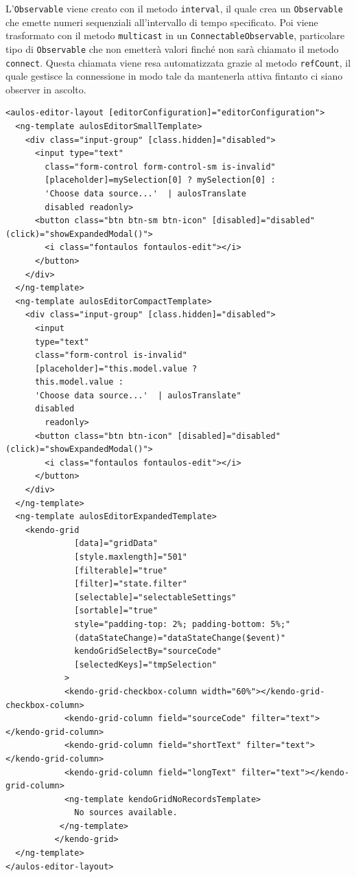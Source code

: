 L'\verb|Observable| viene creato con il metodo \verb|interval|, il quale crea un \verb|Observable| che emette numeri sequenziali all'intervallo di tempo specificato. Poi viene trasformato con il metodo \verb|multicast| in un \verb|ConnectableObservable|, particolare tipo di \verb|Observable| che non emetterà valori finché non sarà chiamato il metodo \verb|connect|. Questa chiamata viene resa automatizzata grazie al metodo \verb|refCount|, il quale gestisce la connessione in modo tale da mantenerla attiva fintanto ci siano observer in ascolto.

\begin{lstlisting}[caption={Classe RefreshService}, style=html]
<aulos-editor-layout [editorConfiguration]="editorConfiguration">
  <ng-template aulosEditorSmallTemplate>
    <div class="input-group" [class.hidden]="disabled">
      <input type="text" 
        class="form-control form-control-sm is-invalid"
        [placeholder]=mySelection[0] ? mySelection[0] : 
        'Choose data source...'  | aulosTranslate 
        disabled readonly>
      <button class="btn btn-sm btn-icon" [disabled]="disabled" (click)="showExpandedModal()">
        <i class="fontaulos fontaulos-edit"></i>
      </button>
    </div>
  </ng-template>
  <ng-template aulosEditorCompactTemplate>
    <div class="input-group" [class.hidden]="disabled">
      <input 
      type="text" 
      class="form-control is-invalid" 
      [placeholder]="this.model.value ? 
      this.model.value : 
      'Choose data source...'  | aulosTranslate" 
      disabled
        readonly>
      <button class="btn btn-icon" [disabled]="disabled" (click)="showExpandedModal()">
        <i class="fontaulos fontaulos-edit"></i>
      </button>
    </div>
  </ng-template>
  <ng-template aulosEditorExpandedTemplate>
    <kendo-grid
              [data]="gridData"
              [style.maxlength]="501"
              [filterable]="true"
              [filter]="state.filter"
              [selectable]="selectableSettings"
              [sortable]="true"
              style="padding-top: 2%; padding-bottom: 5%;"
              (dataStateChange)="dataStateChange($event)"
              kendoGridSelectBy="sourceCode"
              [selectedKeys]="tmpSelection"
            >
            <kendo-grid-checkbox-column width="60%"></kendo-grid-checkbox-column>
            <kendo-grid-column field="sourceCode" filter="text"></kendo-grid-column>
            <kendo-grid-column field="shortText" filter="text"></kendo-grid-column>
            <kendo-grid-column field="longText" filter="text"></kendo-grid-column>
            <ng-template kendoGridNoRecordsTemplate>
              No sources available.
           </ng-template>
          </kendo-grid>
  </ng-template>
</aulos-editor-layout>
\end{lstlisting}